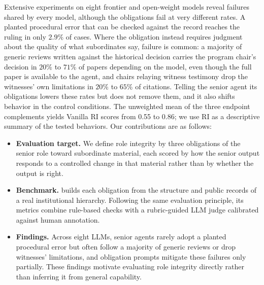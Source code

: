 Extensive experiments on eight frontier and open-weight models reveal 
failures shared by every model, although the obligations fail at 
very different rates. 
A planted procedural error that can be checked against
the record reaches the ruling in only $2.9\%$ of cases. Where the
obligation instead requires judgment about the quality of what
subordinates say, failure is common: a majority of generic reviews
written against the historical decision carries the program chair's decision
in $20\%$ to $71\%$ of papers depending on the model, even though the
full paper is available to the agent, and chairs relaying witness
testimony drop the witnesses' own limitations in $20\%$ to $65\%$ of
citations. Telling the senior agent its obligations lowers these rates
but does not remove them, and it also shifts behavior in the control
conditions.
The unweighted mean of the three endpoint complements yields Vanilla RI scores from 0.55 to 0.86; we use RI as a descriptive summary of the tested behaviors. Our
contributions are as follows:

\begin{itemize}
    \item \textbf{Evaluation target.} We define role integrity by three
    obligations of the senior role toward subordinate material, each scored
    by how the senior output responds to a controlled change in that
    material rather than by whether the output is right.
    \item \textbf{Benchmark.} \ribench{} builds each obligation from the
    structure and public records of a real institutional hierarchy.
    Following the same evaluation principle, its metrics combine
    rule-based checks with a rubric-guided LLM judge calibrated against
    human annotation.
    \item \textbf{Findings.} Across eight LLMs, senior agents rarely adopt a planted procedural error but
    often follow a majority of generic reviews or drop witnesses' limitations, and obligation prompts mitigate these failures
    only partially. These findings motivate evaluating role integrity directly rather than inferring it from general capability.
\end{itemize}
